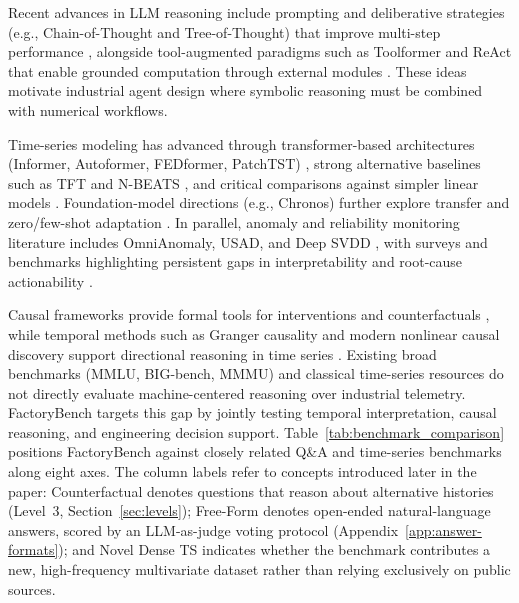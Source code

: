 \documentclass{article}
\begin{document}
Recent advances in LLM reasoning include prompting and deliberative strategies (e.g., Chain-of-Thought and Tree-of-Thought) that improve multi-step performance \cite{wei2022chain,yao2023tree}, alongside tool-augmented paradigms such as Toolformer and ReAct that enable grounded computation through external modules \cite{schick2023toolformer,yao2023react,qin2023tool}. These ideas motivate industrial agent design where symbolic reasoning must be combined with numerical workflows.

Time-series modeling has advanced through transformer-based architectures (Informer, Autoformer, FEDformer, PatchTST) \cite{zhou2021informer,wu2021autoformer,zhou2022fedformer,nie2022time}, strong alternative baselines such as TFT and N-BEATS \cite{lim2021tft,oreshkin2020nbeats}, and critical comparisons against simpler linear models \cite{zeng2023transformers}. Foundation-model directions (e.g., Chronos) further explore transfer and zero/few-shot adaptation \cite{ansari2024chronos,das2024decoder}. In parallel, anomaly and reliability monitoring literature includes OmniAnomaly, USAD, and Deep SVDD \cite{su2019omni,audibert2020usad,ruff2018deep}, with surveys and benchmarks highlighting persistent gaps in interpretability and root-cause actionability \cite{chalapathy2019survey,lavin2015numenta}.

Causal frameworks provide formal tools for interventions and counterfactuals \cite{pearl2009causality,peters2017elements,rubin1974causal}, while temporal methods such as Granger causality and modern nonlinear causal discovery support directional reasoning in time series \cite{granger1969causal,runge2019causal}. Existing broad benchmarks (MMLU, BIG-bench, MMMU) \cite{hendrycks2021mmlu,srivastava2023bigbench,yue2024mmmu} and classical time-series resources \cite{laptev2015generic,dau2019ucr,wen2022transformers} do not directly evaluate machine-centered reasoning over industrial telemetry. FactoryBench targets this gap by jointly testing temporal interpretation, causal reasoning, and engineering decision support. Table~\ref{tab:benchmark_comparison} positions FactoryBench against closely related Q\&A and time-series benchmarks along eight axes. The column labels refer to concepts introduced later in the paper: Counterfactual denotes questions that reason about alternative histories (Level~3, Section~\ref{sec:levels}); Free-Form denotes open-ended natural-language answers, scored by an LLM-as-judge voting protocol (Appendix~\ref{app:answer-formats}); and Novel Dense TS indicates whether the benchmark contributes a new, high-frequency multivariate dataset rather than relying exclusively on public sources.
\end{document}
